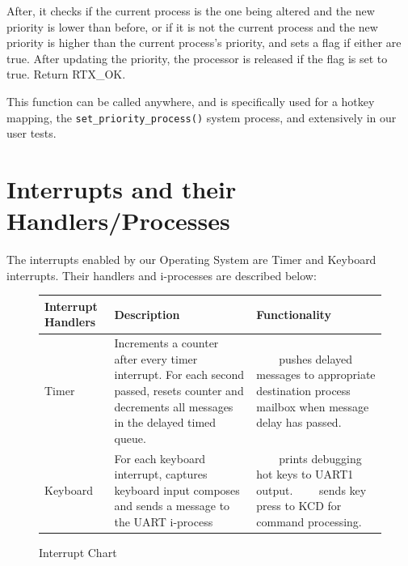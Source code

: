 \documentclass[11pt, oneside]{article}
\newcommand{\tabitem}{~~\llap{\textbullet}~~}
\begin{document}
After, it checks if the current process is the one being altered and the new priority is lower than before, or if it is not the current process and the new priority is higher than the current process's priority, and sets a flag if either are true. After updating the priority, the processor is released if the flag is set to true. Return RTX\_OK.

This function can be called anywhere, and is specifically used for a hotkey mapping, the {\tt set\_priority\_process()} system process, and extensively in our user tests.

\newpage

\section{Interrupts and their Handlers/Processes}
The interrupts enabled by our Operating System are Timer and Keyboard interrupts. Their handlers and i-processes are described below:
\begin{figure}[ht!]
\centering
\begin{tabular}{|L{2cm}|L{6cm}|L{7cm}|} \hline
 \textbf{Interrupt Handlers} & \textbf{Description} & \textbf{Functionality} \\ \hline
Timer &
Increments a counter after every timer interrupt. For each second passed, resets counter and decrements all messages in the delayed timed queue.
&
\tabitem pushes delayed messages to appropriate destination process mailbox when message delay has passed.
\\ \hline
Keyboard & For each keyboard interrupt, captures keyboard input composes and sends a message to the UART i-process &

\tabitem prints debugging hot keys to UART1 output. \newline
\tabitem sends key press to KCD for command processing. \\ \hline
\end{tabular}
\caption{Interrupt Chart \label{overflow}}
\end{figure}
\end{document}
